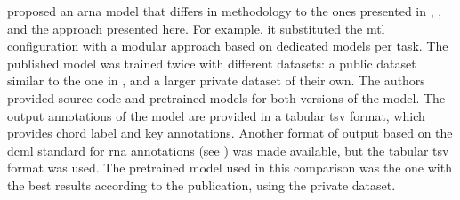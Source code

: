 
\textcite{mcleod2021modular} proposed an \gls{arna} model
that differs in methodology to the ones presented in
\textcite{chen2021attend}, \textcite{micchi2021deep}, and
the approach presented here. For example, it substituted the
\gls{mtl} configuration with a modular approach based on
dedicated models per task. The published model was trained
twice with different datasets: a public dataset similar to
the one in \textcite{micchi2021deep}, and a larger private
dataset of their own. The authors provided source code and
pretrained models for both versions of the model. The output
annotations of the model are provided in a tabular \gls{tsv}
format, which provides chord label and key annotations.
Another format of output based on the \gls{dcml} standard
for \gls{rna} annotations (see )
was made available, but the tabular \gls{tsv} format was
used. The pretrained model used in this comparison was the
one with the best results according to the publication,
using the private dataset.
